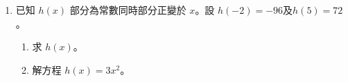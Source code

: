 \documentclass[11pt]{article}
\begin{document}
\begin{enumerate}
            \hrulefill
            
            \hrulefill
            
            \hrulefill
            
            \hrulefill
            
            \hrulefill
            
            \hrulefill

        \pagebreak
        \item 已知 $h(x)$ 部分為常數同時部分正變於 $x$。設 $h(-2)=-96$及$h(5)=72$。\begin{enumerate}
            \item 求 $h(x)$。
            \item 解方程 $h(x)=3x^2$。
        \end{enumerate}

        \hrulefill
            
            \hrulefill
            
            \hrulefill
            
            \hrulefill
            
            \hrulefill
            
            \hrulefill
            
            \hrulefill
            
            \hrulefill
            
            \hrulefill
            
            \hrulefill
            
            \hrulefill

            \hrulefill

            \hrulefill
            
            \hrulefill
            
            \hrulefill
            
            \hrulefill
            
            \hrulefill
            
            \hrulefill
            
            \hrulefill
            
            \hrulefill
            
            \hrulefill
            
            \hrulefill
            
            \hrulefill


\end{enumerate}
\end{document}
